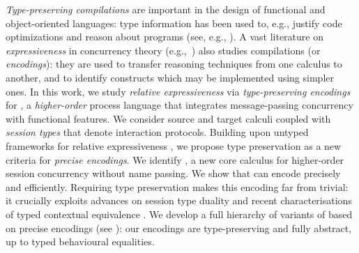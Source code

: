 

\emph{Type-preserving compilations} are important in the design of
functional and object-oriented languages: type information has been
used to, e.g., justify code optimizations and reason about programs
(see, e.g.,
\cite{DBLP:journals/toplas/MorrisettWCG99,DBLP:conf/pldi/ShaoA95,DBLP:journals/toplas/LeagueST02}).
A vast literature on 
{\em expressiveness} 
in concurrency theory  
(e.g.,~\cite{Palamidessi03,DBLP:journals/iandc/Gorla10,DBLP:conf/icalp/LanesePSS10})
also studies compilations (or \emph{encodings}):
they are used to transfer reasoning techniques 
from one calculus to another, and to identify 
constructs which may be implemented
using simpler ones. 
In this work, we study 
{\em relative expressiveness} 
via \emph{type-preserving encodings} for \HOp, a \emph{higher-order} 
process language that integrates message-passing concurrency with functional features.
We consider source and target calculi coupled with \emph{session types} that denote interaction protocols. 
Building upon untyped frameworks for relative expressiveness
\cite{DBLP:journals/iandc/Gorla10}, 
we propose type preservation as a {new criteria} for \emph{precise encodings}.
We identify \HO, a new core calculus for higher-order session concurrency without
name passing. 
We show that \HO can encode \HOp precisely and efficiently. 
Requiring  
type preservation makes
this encoding far from trivial: it crucially exploits advances on
session type duality \cite{TGC14,DBLP:journals/corr/abs-1202-2086} and recent
characterisations of typed contextual equivalence \cite{characteristic_bis}.
We develop a full hierarchy of variants of \HOp based on 
precise encodings (see ):
our encodings are
type-preserving and fully abstract, up to typed
behavioural equalities. 

